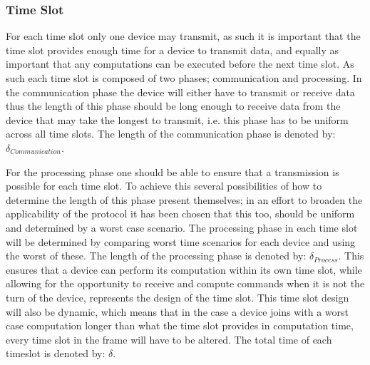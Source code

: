 \subsubsection*{Time Slot}
For each time slot only one device may transmit, as such it is important that the time slot provides enough time for a device to transmit data, and equally as important that any computations can be executed before the next time slot.
As such each time slot is composed of two phases; communication and processing.
In the communication phase the device will either have to transmit or receive data thus the length of this phase should be long enough to receive data from the device that may take the longest to transmit, i.e. this phase has to be uniform across all time slots.
The length of the communication phase is denoted by: $\delta_{Communication}$.

\bigskip \noindent
For the processing phase one should be able to ensure that a transmission is possible for each time slot.
To achieve this several possibilities of how to determine the length of this phase present themselves; in an effort to broaden the applicability of the protocol it has been chosen that this too, should be uniform and determined by a worst case scenario.
The processing phase in each time slot will be determined by comparing worst time scenarios for each device and using the worst of these.
The length of the processing phase is denoted by: $\delta_{Process}$.
This ensures that a device can perform its computation within its own time slot, while allowing for the opportunity to receive and compute commands when it is not the turn of the device,  represents the design of the time slot.
This time slot design will also be dynamic, which means that in the case a device joins with a worst case computation longer than what the time slot provides in computation time, every time slot in the frame will have to be altered.
The total time of each timeslot is denoted by: $\delta$.
